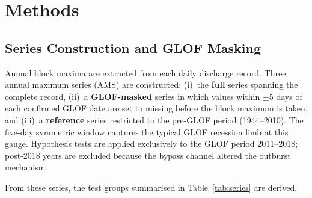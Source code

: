\section{Methods}
\label{sec:methods}

\subsection{Series Construction and GLOF Masking}

Annual block maxima are extracted from each daily discharge record. Three annual maximum
series (AMS) are constructed: (i)~the \textbf{full} series spanning the complete record,
(ii)~a \textbf{GLOF-masked} series in which values within $\pm 5$ days of each confirmed
GLOF date are set to missing before the block maximum is taken, and (iii)~a
\textbf{reference} series restricted to the pre-GLOF period (1944--2010). The five-day
symmetric window captures the typical GLOF recession limb at this gauge. Hypothesis tests
are applied exclusively to the GLOF period 2011--2018; post-2018 years are excluded
because the bypass channel altered the outburst mechanism.

From these series, the test groups summarised in Table~\ref{tab:series} are derived.

\begin{table}[H]
  \centering
  \caption{Annual maximum series and test groups used in the homogeneity tests.
           GRDC data extend to 2020 only; $n$ values for GRDC reflect this shorter record.}
  \label{tab:series}
\end{table}

